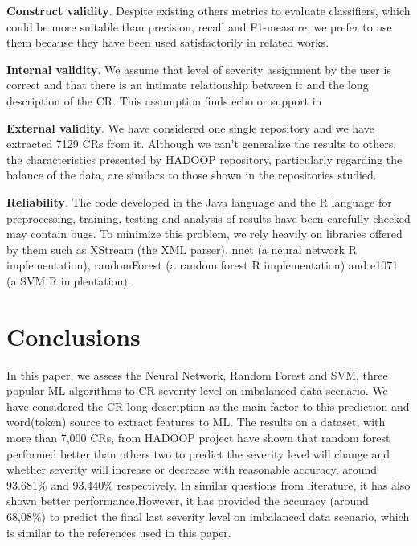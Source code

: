\documentclass[10pt, conference]{IEEEtran}
\begin{document}
\textbf{Construct validity}. Despite existing others metrics to evaluate classifiers\cite{Facelli2015}, which could be more suitable than precision, recall and F1-measure, we prefer to use them because they have been used satisfactorily in related works\cite{Menzies2008, Lamkanfi2010, Lamkanfi2011, ValdiviaGarcia2014}.


\textbf{Internal validity}. We assume that level of severity assignment by the user is correct and that there is an intimate relationship between it and the long description of the CR. This assumption finds echo or support in \cite{Lamkanfi2010, Tian2012}

\textbf{External validity}. We have considered one single repository and we have extracted 7129 CRs from it. Although we can't generalize the results to others, the characteristics presented by HADOOP repository, particularly regarding the balance of the data, are similars to those shown in the repositories studied\cite{Lamkanfi2010, Lamkanfi2011, Tian2012,ValdiviaGarcia2014}.

\textbf{Reliability}. The code developed in the Java language and the R language for preprocessing, training, testing and analysis of results have been carefully checked may contain bugs. To minimize this problem, we rely heavily on libraries offered by them such as XStream (the XML parser), nnet (a neural network R implementation), randomForest (a random forest R implementation) and e1071 (a SVM R implentation). 

\section{Conclusions} \label{sec:conclusion}
In this paper, we assess the Neural Network, Random Forest and SVM, three popular ML algorithms to CR severity level on imbalanced data scenario. We have considered the CR long description as the main factor to this prediction and word(token) source to extract features to ML. The results on a dataset, with more than
7,000 CRs, from HADOOP project have shown that random forest performed better than others two to predict the severity level will change and whether severity will increase or decrease with reasonable accuracy, around 93.681\% and 93.440\% respectively. In similar questions from literature, it has also shown better performance.However, it has provided the accuracy (around 68,08\%) to predict the final last severity level on imbalanced data scenario, which is similar to the references used in this paper.
\end{document}
